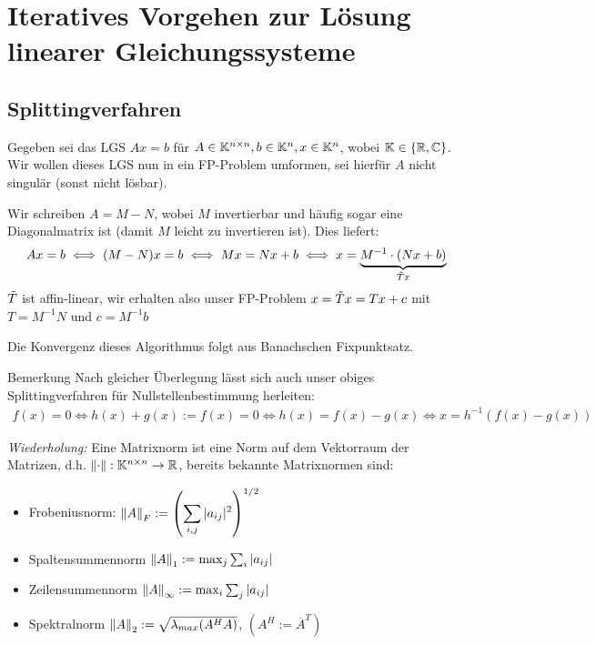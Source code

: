 \section{Iteratives Vorgehen zur Lösung linearer Gleichungssysteme}

\subsection{Splittingverfahren}

Gegeben sei das LGS $Ax=b$ für $A\in\mathbb K^{n\times n}, b\in\mathbb K^n, x\in\mathbb K^n$, 
wobei $\mathbb K\in\{\mathbb R, \mathbb C\}$. Wir wollen dieses LGS nun in ein FP-Problem umformen, 
sei hierfür $A$ nicht singulär (sonst nicht lösbar). 

Wir schreiben $A=M-N$, wobei $M$ invertierbar und häufig sogar eine Diagonalmatrix ist 
(damit $M$ leicht zu invertieren ist). Dies liefert:
%
\begin{align*}
  Ax = b 
  \iff 
  (M-N)x=b 
  \iff 
  Mx=Nx+b
  \iff
  x=\underbrace{M^{-1}\cdot(Nx+b)}_{\Tilde{T}x}
\end{align*}
%
$\Tilde{T}$ ist affin-linear, wir erhalten also unser FP-Problem $x=\Tilde{T}x=Tx+c$ 
mit $T=M^{-1}N$ und $c=M^{-1}b$ 


Die Konvergenz dieses Algorithmus folgt aus Banachschen Fixpunktsatz.

\begin{colbox}{Bemerkung}
  Nach gleicher Überlegung lässt sich auch unser obiges Splittingverfahren für Nullstellenbestimmung herleiten:
  \begin{align*}
    f(x)=0
    \iff 
    h(x)+g(x):=f(x) = 0 
    \iff 
    h(x)=f(x)-g(x) 
    \iff
    x=h^{-1}(f(x)-g(x))
    \end{align*}
\end{colbox}

\textit{Wiederholung:} Eine Matrixnorm ist eine Norm auf dem Vektorraum der Matrizen, 
d.h. $\vertn{2}{\cdot}:\K^{n\times n}\rightarrow \R$, bereits bekannte Matrixnormen sind:

\begin{itemize}
  \item Frobeniusnorm: $\vertn{2}{A}_F := \left(\displaystyle \sum_{i,j}|a_{ij}|^2\right)^{1/2}$
  \item Spaltensummennorm $\vertn{2}{A}_1:=\max_j \sum_i |a_{ij}|$
  \item Zeilensummennorm $\vertn{2}{A}_\infty:=\max_i \sum_j |a_{ij}|$
  \item Spektralnorm $\vertn{2}{A}_2:=\sqrt{\lambda_{max}(A^HA)}$, \qquad $(A^H := \overline{A}^T)$
\end{itemize}

